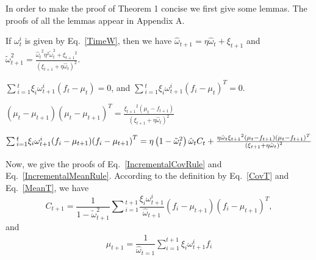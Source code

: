 \documentclass[sigconf]{acmart}
\begin{document}
In order to make the proof of Theorem 1 concise we first give some
lemmas. The proofs of all the lemmas appear in Appendix A.

\begin{lemma}
\label{LemmaSum}
If $\omega _t^i$ is given by Eq.~\ref{TimeW}, then we have
${{\hat \omega }_{t + 1}} = \eta {{\hat \omega }_t} + {\xi _{t + 1}}$ and $\tilde \omega _{t + 1}^2 = \frac{{{{\hat \omega }_t}^2{\eta ^2}\tilde \omega _t^2 + {\xi _{t + 1}}^2}}{{{{\left( {{\xi _{t + 1}} + \eta {{\hat \omega }_t}} \right)}^2}}}$.
\end{lemma}

\begin{lemma}
\label{Transpose}
$\sum {_{i = 1}^t{\xi _i}\omega _{t + 1}^i({f_t} - {\mu _t})}=0$,
and ${\sum {_{i = 1}^t{\xi _i}\omega _{t + 1}^i({f_i} - {\mu _t})} ^T} = 0$.
\end{lemma}
\begin{lemma}
\label{TransposeMul}
$\left( {{\mu _t} - {\mu _{t + 1}}} \right){\left( {{\mu _t} - {\mu _{t + 1}}} \right)^T} = \frac{{{\xi _{t + 1}}^2\left( {{\mu _t} - {f_{t + 1}}} \right)}}{{{{\left( {{\xi _{t + 1}} + \eta {{\hat \omega }_t}} \right)}^2}}}$
\end{lemma}
\begin{lemma}
\label{FeatureAndMuTransposeMul}
$\sum {_{i = 1}^t{\xi _i}\omega _{t + 1}^i({f_i} - {\mu _{t + 1}}){{({f_i} - {\mu _{t + 1}})}^T}}\\ = \eta \left( {1 - \tilde \omega _t^2} \right){{\hat \omega }_t}{C_t} + \frac{{\eta {{\hat \omega }_t}{\xi _{t + 1}}^2\left( {{\mu _t} - {f_{t + 1}}} \right){{\left( {{\mu _t} - {f_{t + 1}}} \right)}^T}}}{{{{\left( {{\xi _{t + 1}} + \eta {{\hat \omega }_t}} \right)}^2}}}$
\end{lemma}
Now, we give the proofs of Eq.~\ref{IncrementalCovRule} and Eq.~\ref{IncrementalMeanRule}.
According to the definition by Eq.~\ref{CovT} and Eq.~\ref{MeanT}, we have
\begin{equation}\label{CovTplusOne}
{C_{t + 1}} = \frac{1}{{1 - \tilde \omega _{t + 1}^2}}\sum {_{i = 1}^{t + 1}\frac{{{\xi _i}\omega _{t + 1}^i}}{{{{\hat \omega }_{t + 1}}}}({f_i} - {\mu _{t+ 1}}){{({f_i} - {\mu _{t + 1}})}^T}},
\end{equation}
and
\begin{align}
\label{MeanTplusOne}
 \mu_{t+1}=\dfrac{1}{\hat{\omega}_{t=1}}\sum_{i=1}^{t+1}\xi_i\omega_{t+1}^{i}f_i
\end{align}
\end{document}
